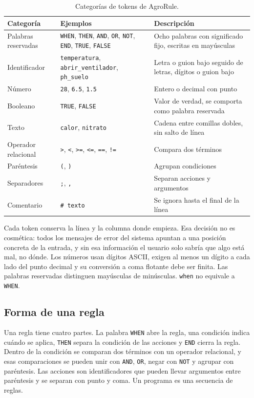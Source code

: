 \documentclass[11pt,letterpaper]{article}
\newcommand{\code}[1]{\texttt{#1}}
\newcommand{\dq}{\textquotedbl{}}
\begin{document}
\begin{table}[htbp]
\centering
\caption{Categorías de tokens de AgroRule.}
\label{tab:tokens}
\small
\begin{tabular}{L{2.6cm}L{5.4cm}L{7.4cm}}
\toprule
\textbf{Categoría} & \textbf{Ejemplos} & \textbf{Descripción} \\
\midrule
Palabras reservadas & \code{WHEN}, \code{THEN}, \code{AND}, \code{OR}, \code{NOT}, \code{END}, \code{TRUE}, \code{FALSE} & Ocho palabras con significado fijo, escritas en mayúsculas \\
Identificador & \code{temperatura}, \code{abrir\_ventilador}, \code{ph\_suelo} & Letra o guion bajo seguido de letras, dígitos o guion bajo \\
Número & \code{28}, \code{6.5}, \code{1.5} & Entero o decimal con punto \\
Booleano & \code{TRUE}, \code{FALSE} & Valor de verdad, se comporta como palabra reservada \\
Texto & \code{\dq calor\dq}, \code{\dq nitrato\dq} & Cadena entre comillas dobles, sin salto de línea \\
Operador relacional & \code{>}, \code{<}, \code{>=}, \code{<=}, \code{==}, \code{!=} & Compara dos términos \\
Paréntesis & \code{(}, \code{)} & Agrupan condiciones \\
Separadores & \code{;}, \code{,} & Separan acciones y argumentos \\
Comentario & \code{\# texto} & Se ignora hasta el final de la línea \\
\bottomrule
\end{tabular}
\end{table}

Cada token conserva la línea y la columna donde empieza. Esa decisión no es cosmética: todos los mensajes de error del sistema apuntan a una posición concreta de la entrada, y sin esa información el usuario solo sabría que algo está mal, no dónde. Los números usan dígitos ASCII, exigen al menos un dígito a cada lado del punto decimal y su conversión a coma flotante debe ser finita. Las palabras reservadas distinguen mayúsculas de minúsculas. \code{when} no equivale a \code{WHEN}.

\subsection{Forma de una regla}

Una regla tiene cuatro partes. La palabra \code{WHEN} abre la regla, una condición indica cuándo se aplica, \code{THEN} separa la condición de las acciones y \code{END} cierra la regla. Dentro de la condición se comparan dos términos con un operador relacional, y esas comparaciones se pueden unir con \code{AND}, \code{OR}, negar con \code{NOT} y agrupar con paréntesis. Las acciones son identificadores que pueden llevar argumentos entre paréntesis y se separan con punto y coma. Un programa es una secuencia de reglas.
\end{document}
